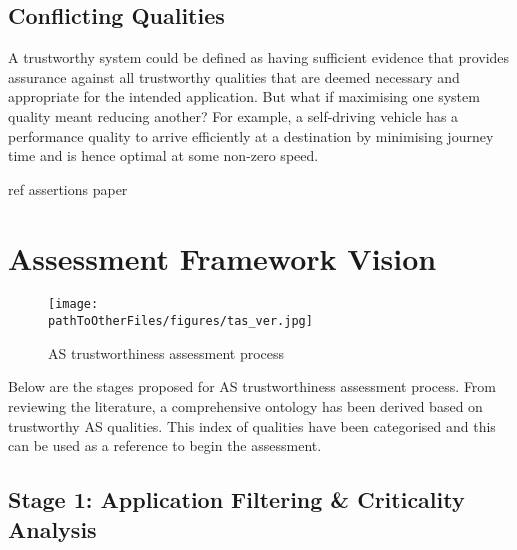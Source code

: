 \subsection{Conflicting Qualities} \label{sec:conflict}

A trustworthy system could be defined as having sufficient evidence that provides assurance against all trustworthy qualities that are deemed necessary and appropriate for the intended application. But what if maximising one system quality meant reducing another? 
%
For example, a self-driving vehicle has a performance quality to arrive efficiently at a destination by minimising journey time and is hence optimal at some non-zero speed. 

ref assertions paper



\section{Assessment Framework Vision} \label{sec:AssFramVis}

\begin{figure*}[]
    \centering
    \texttt{[image: \\pathToOtherFiles/figures/tas\_ver.jpg]}
    \caption{AS trustworthiness assessment process}
    \label{fig:tas_ver}
\end{figure*}

Below are the stages proposed for AS trustworthiness assessment process.
%
From reviewing the literature, a comprehensive ontology has been derived based on trustworthy AS qualities. This index of qualities have been categorised and this can be used as a reference to begin the assessment. 


\subsection{Stage 1: Application Filtering \& Criticality Analysis}


